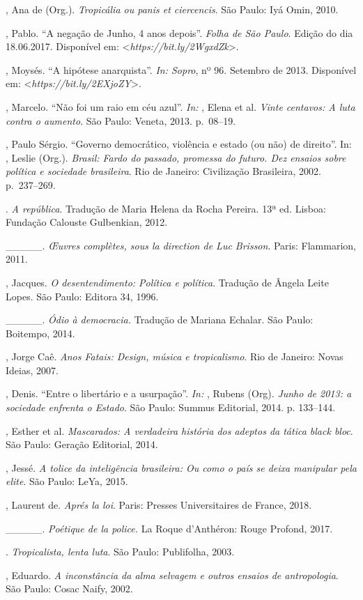 \begin{Parskip}
, Ana de (Org.). \emph{Tropicália ou panis et
ciercencis}. São Paulo: Iyá Omin, 2010.

, Pablo. ``A negação de Junho, 4 anos depois''. \emph{Folha
de São Paulo}. Edição do dia 18.06.2017. Disponível em:
\textless{}\emph{https://bit.ly/2WgxdZk}\textgreater{}.

, Moysés. ``A hipótese anarquista''. \emph{In: Sopro}, nº
96. Setembro de 2013. Disponível em:
\textless{}\emph{https://bit.ly/2EXjoZY}\textgreater{}.

, Marcelo. ``Não foi um raio em céu azul''. \emph{In:}
, Elena et al. \emph{Vinte centavos: A luta
contra o aumento}. São Paulo: Veneta, 2013. p.~08--19.

, Paulo Sérgio. ``Governo democrático, violência e estado
(ou não) de direito''. In: , Leslie (Org.). \emph{Brasil: Fardo do
passado, promessa do futuro. Dez ensaios sobre política e sociedade
brasileira}. Rio de Janeiro: Civilização Brasileira, 2002. p.~237--269.

. \emph{A república}. Tradução de Maria Helena da
Rocha Pereira. 13ª ed. Lisboa: Fundação Calouste Gulbenkian, 2012.

\_\_\_\_\_. \emph{Œuvres complètes, sous la direction de Luc
Brisson}. Paris: Flammarion, 2011.

, Jacques. \emph{O desentendimento: Política e
política}. Tradução de Ângela Leite Lopes. São Paulo: Editora 34, 1996.

\_\_\_\_\_. \emph{Ódio à democracia. }Tradução de Mariana
Echalar. São Paulo: Boitempo, 2014.

, Jorge Caê. \emph{Anos Fatais: Design, música e
tropicalismo}. Rio de Janeiro: Novas Ideias, 2007.

, Denis. ``Entre o libertário e a usurpação''. \emph{In:
}, Rubens (Org). \emph{Junho de 2013: a sociedade enfrenta o
Estado}. São Paulo: Summus Editorial, 2014. p. 133--144.

, Esther et al. \emph{Mascarados: A verdadeira história
dos adeptos da tática black bloc}. São Paulo: Geração Editorial, 2014.

, Jessé. \emph{A tolice da inteligência brasileira: Ou como
o país se deixa manipular pela elite}. São Paulo: LeYa, 2015.

, Laurent de. \emph{Aprés la loi}. Paris: Presses
Universitaires de France, 2018.

\_\_\_\_\_. \emph{Poétique de la police.} La Roque d'Anthéron: Rouge
Profond, 2017.

. \emph{Tropicalista, lenta luta}. São Paulo: Publifolha, 2003.

, Eduardo. \emph{A inconstância da alma
selvagem e outros ensaios de antropologia}. São Paulo: Cosac Naify, 2002.
\end{Parskip}

